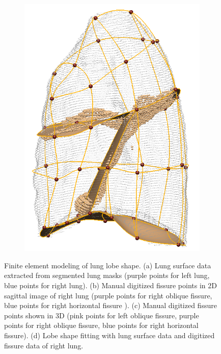 {\begin{figure}[htbp]
\begin{subfigure}{.32\linewidth}
  \includegraphics[width=\linewidth,trim={{.0\wd0} {.0\wd0} {.0\wd0} {.0\wd0}},clip]{Segmentation/Image/LobeFitting2.png}
  \caption{}
  \label{fig:LobeShapeGenereation-d} 
\end{subfigure}
\caption{Finite element modeling of lung lobe shape. (a) Lung surface data extracted from segmented lung masks (purple points for left lung, blue points for right lung). (b) Manual digitized fissure points in 2D sagittal image of right lung (purple points for right oblique fissure, blue points for right horizontal fissure ). (c) Manual digitized fissure points shown in 3D (pink points for left oblique fissure, purple points for right oblique fissure, blue points for right horizontal fissure). (d) Lobe shape fitting with lung surface data and digitized fissure data of right lung.}
\label{fig:LobeShapeGenereation}
\end{figure}

}
